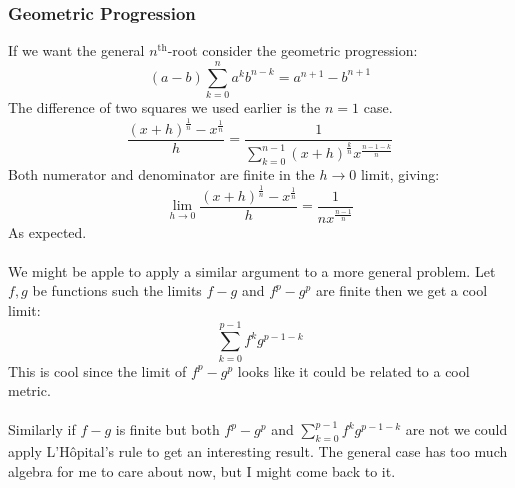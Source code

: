 \subsubsection{Geometric Progression}
If we want the general $n^\text{th}$-root consider the geometric progression:
\[(a-b)\sum_{k=0}^{n}a^kb^{n-k} = a^{n+1}-b^{n+1}\]
The difference of two squares we used earlier is the $n=1$ case.
\\
\[\frac{(x+h)^\frac{1}{n}-x^\frac{1}{n}}{h} = \frac{1}{\sum_{k=0}^{n-1}(x+h)^\frac{k}{n}x^\frac{n-1-k}{n}}\]
Both numerator and denominator are finite in the $h\rightarrow 0$ limit, giving:
\[\lim_{h\rightarrow 0}\frac{(x+h)^\frac{1}{n}-x^\frac{1}{n}}{h} = \frac{1}{nx^\frac{n-1}{n}}\]
As expected.
\\
\\
We might be apple to apply a similar argument to a more general problem.
Let $f,g$ be functions such the limits $f-g$ and $f^p-g^p$ are finite then we get a cool limit:
\[\sum_{k=0}^{p-1}f^kg^{p-1-k}\]
This is cool since the limit of $f^p-g^p$ looks like it could be related to a cool metric.
\\
\\
Similarly if $f-g$ is finite but both $f^p-g^p$ and $\sum_{k=0}^{p-1}f^kg^{p-1-k}$ are not we could apply L'Hôpital's rule to get an interesting result.
The general case has too much algebra for me to care about now, 
but I might come back to it.
